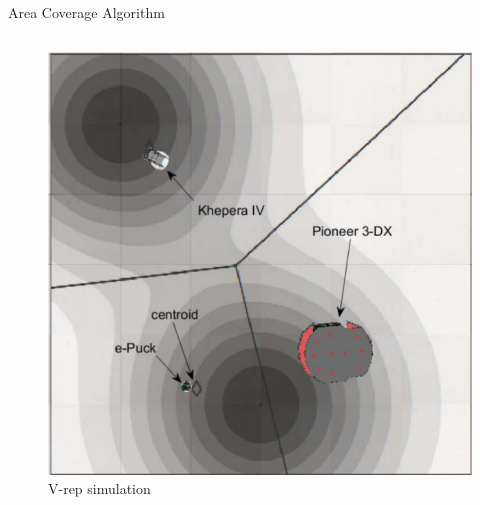 \documentclass{beamer}
\begin{document}
\begin{frame}{Area Coverage Algorithm}
\begin{columns}
\begin{column}{0.5\textwidth}
\begin{center}
\begin{figure}
\includegraphics[scale=0.2]{figs/img/areaCoverage.png}
\caption{V-rep simulation}
\end{figure}
\end{center}
\end{column}
\end{columns}
\end{frame}
\end{document}
